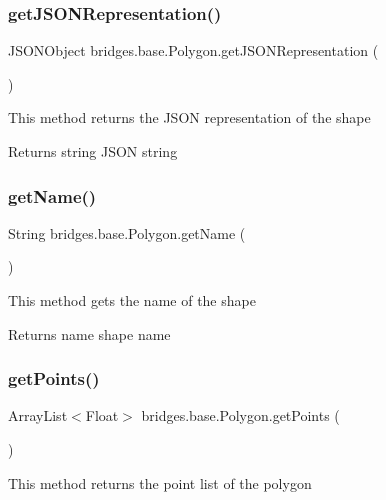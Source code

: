 \subsubsection{\texorpdfstring{getJSONRepresentation()}{getJSONRepresentation()}}
{\footnotesize\ttfamily J\+S\+O\+N\+Object bridges.\+base.\+Polygon.\+get\+J\+S\+O\+N\+Representation (\begin{DoxyParamCaption}{ }\end{DoxyParamCaption})}

This method returns the J\+S\+ON representation of the shape

\begin{DoxyReturn}{Returns}
string J\+S\+ON string 
\end{DoxyReturn}
\mbox{\label{classbridges_1_1base_1_1_polygon_a2203367acb1a26dfa1a81d69ce61274f}} 
\subsubsection{\texorpdfstring{getName()}{getName()}}
{\footnotesize\ttfamily String bridges.\+base.\+Polygon.\+get\+Name (\begin{DoxyParamCaption}{ }\end{DoxyParamCaption})}

This method gets the name of the shape

\begin{DoxyReturn}{Returns}
name shape name 
\end{DoxyReturn}
\mbox{\label{classbridges_1_1base_1_1_polygon_adf81f52211ad3c2c8318461e199b6df5}} 
\subsubsection{\texorpdfstring{getPoints()}{getPoints()}}
{\footnotesize\ttfamily Array\+List$<$Float$>$ bridges.\+base.\+Polygon.\+get\+Points (\begin{DoxyParamCaption}{ }\end{DoxyParamCaption})}

This method returns the point list of the polygon

